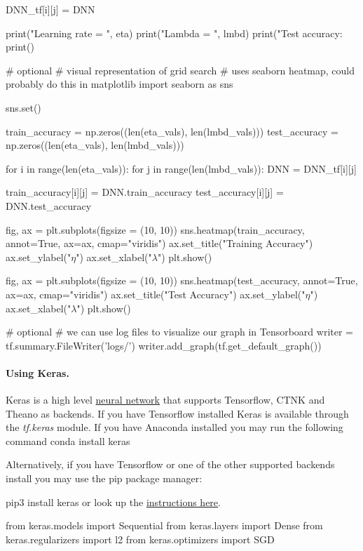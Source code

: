 \documentclass[%
oneside,                 %
final,                   %
10pt]{article}
\begin{document}
        DNN_tf[i][j] = DNN
        
        print("Learning rate = ", eta)
        print("Lambda = ", lmbd)
        print("Test accuracy: %
        print()
\epycod

\bpycod
# optional
# visual representation of grid search
# uses seaborn heatmap, could probably do this in matplotlib
import seaborn as sns

sns.set()

train_accuracy = np.zeros((len(eta_vals), len(lmbd_vals)))
test_accuracy = np.zeros((len(eta_vals), len(lmbd_vals)))

for i in range(len(eta_vals)):
    for j in range(len(lmbd_vals)):
        DNN = DNN_tf[i][j]

        train_accuracy[i][j] = DNN.train_accuracy
        test_accuracy[i][j] = DNN.test_accuracy

        
fig, ax = plt.subplots(figsize = (10, 10))
sns.heatmap(train_accuracy, annot=True, ax=ax, cmap="viridis")
ax.set_title("Training Accuracy")
ax.set_ylabel("$\eta$")
ax.set_xlabel("$\lambda$")
plt.show()

fig, ax = plt.subplots(figsize = (10, 10))
sns.heatmap(test_accuracy, annot=True, ax=ax, cmap="viridis")
ax.set_title("Test Accuracy")
ax.set_ylabel("$\eta$")
ax.set_xlabel("$\lambda$")
plt.show()
\epycod

\bpycod
# optional
# we can use log files to visualize our graph in Tensorboard
writer = tf.summary.FileWriter('logs/')
writer.add_graph(tf.get_default_graph())
\epycod



\paragraph{Using Keras.}
Keras is a high level \href{{https://en.wikipedia.org/wiki/Application_programming_interface}}{neural network}
that supports Tensorflow, CTNK and Theano as backends.  
If you have Tensorflow installed Keras is available through the \emph{tf.keras} module.  
If you have Anaconda installed you may run the following command
\bpycod
conda install keras
\epycod

Alternatively, if you have Tensorflow or one of the other supported backends install you may use the pip package manager: 

\bpycod
pip3 install keras
\epycod
or look up the \href{{https://keras.io/}}{instructions here}.

\bpycod
from keras.models import Sequential
from keras.layers import Dense
from keras.regularizers import l2
from keras.optimizers import SGD
\end{document}
